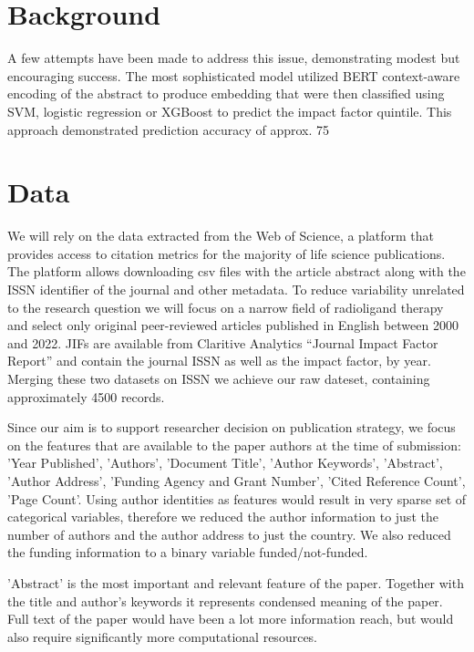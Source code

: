 \documentclass[11pt]{article}
\begin{document}
\section{Background}
A few attempts have been made to address this issue, demonstrating modest but encouraging success. \citep{Macri2023-tr, Alohali2022-no, 10.1162/qss_a_00258, doi:10.1152/japplphysiol.00489.2020} The most sophisticated model utilized BERT context-aware encoding of the abstract to produce embedding that were then classified using  SVM, logistic regression or XGBoost to predict the impact factor quintile. This approach demonstrated prediction accuracy of approx. 75%

\section{Data}
We will rely on the data extracted from the Web of Science, a platform that provides access to citation metrics for the majority of life science publications. The platform allows downloading csv files with the article abstract along with the ISSN identifier of the journal and other metadata. To reduce variability unrelated to the research question we will focus on a narrow field of radioligand therapy and select only original peer-reviewed articles published in English between 2000 and 2022. JIFs are available from Claritive Analytics “Journal Impact Factor Report” and contain the journal ISSN as well as the impact factor, by year. Merging these two datasets on ISSN we achieve our raw dateset, containing approximately 4500 records.

Since our aim is to support researcher decision on publication strategy, we focus on the features that are available to the paper authors at the time of submission: 'Year Published', 'Authors', 'Document Title', 'Author Keywords', 'Abstract', 'Author Address', 'Funding Agency and Grant Number', 'Cited Reference Count', 'Page Count'. Using author identities as features would result in very sparse set of categorical variables, therefore we reduced the author information to just the number of authors and the author address to just the country. We also reduced the funding information to a binary variable funded/not-funded.

'Abstract' is the most important and relevant feature of the paper. Together with the title and author's keywords it represents condensed meaning of the paper. Full text of the paper would have been a lot more information reach, but would also require significantly more computational resources. 
\end{document}
